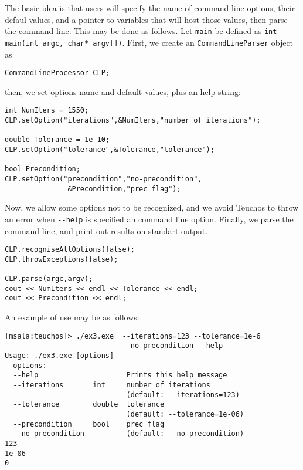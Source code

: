 The basic idea is that users will specify the name of command line
options, their defaul values, and a pointer to variables that will host
those values, then parse the command line. This may be done as
follows. Let \verb!main! be defined as \verb!int main(int argc, char* argv[])!. First, we create an \verb!CommandLineParser! object as
\begin{verbatim}
CommandLineProcessor CLP;
\end{verbatim}
then, we set options name and default values, plus an help string:
\begin{verbatim}    
int NumIters = 1550;
CLP.setOption("iterations",&NumIters,"number of iterations");

double Tolerance = 1e-10;    
CLP.setOption("tolerance",&Tolerance,"tolerance");
    
bool Precondition;
CLP.setOption("precondition","no-precondition",
               &Precondition,"prec flag");
\end{verbatim}
Now, we allow some options not to be recognized, and we avoid Teuchos to
throw an error when \verb!--help! is specified an command line
option. Finally, we parse the command line, and print out results on
standart output.
\begin{verbatim}    
CLP.recogniseAllOptions(false);
CLP.throwExceptions(false);
    
CLP.parse(argc,argv);
cout << NumIters << endl << Tolerance << endl;
cout << Precondition << endl;
\end{verbatim}
An example of use may be as follows:
\begin{verbatim}
[msala:teuchos]> ./ex3.exe  --iterations=123 --tolerance=1e-6  
                            --no-precondition --help
Usage: ./ex3.exe [options]
  options:
  --help                     Prints this help message
  --iterations       int     number of iterations
                             (default: --iterations=123)
  --tolerance        double  tolerance
                             (default: --tolerance=1e-06)
  --precondition     bool    prec flag
  --no-precondition          (default: --no-precondition)
123
1e-06
0
\end{verbatim}




